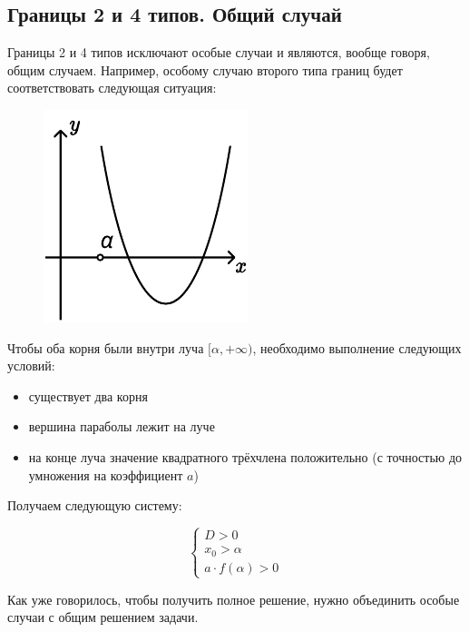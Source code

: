 \pagebreak

\subsection {Границы 2 и 4 типов. Общий случай}

Границы 2 и 4 типов исключают особые случаи и являются, вообще говоря, общим случаем.
Например, особому случаю второго типа границ будет соответствовать следующая ситуация:

\begin {figure} [h]
    \begin {minipage} [t] {\linewidth}
        \centering
        \includegraphics [width=0.3\linewidth] {images/image_11.pdf}
    \end {minipage}
\end {figure}

Чтобы оба корня были внутри луча $[\alpha, +\infty)$, необходимо выполнение следующих условий:

\begin {itemize}
    \item {существует два корня}
    \item {вершина параболы лежит на луче}
    \item {на конце луча значение квадратного трёхчлена положительно (с точностью до умножения на
           коэффициент $a$)}
\end {itemize}

Получаем следующую систему:

\begin {equation*}
    \begin {cases}
        D > 0
        \\
        x_0 > \alpha
        \\
        a \cdot f(\alpha) > 0
    \end {cases}
\end {equation*}

Как уже говорилось, чтобы получить полное решение, нужно объединить особые случаи с общим решением
задачи.
